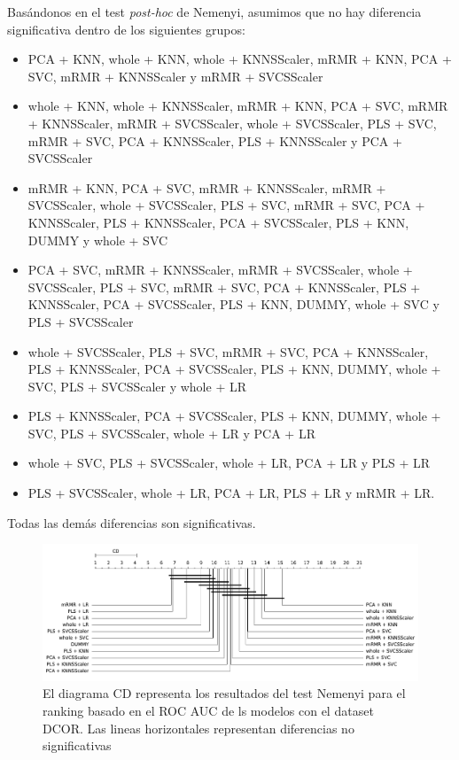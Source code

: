 \documentclass[a4paper,oneside,11pt,leqno]{article}
\begin{document}
	Basándonos en el test \textit{post-hoc} de Nemenyi, asumimos que no hay diferencia significativa dentro de los siguientes grupos:

	\begin{itemize}
		\item PCA + KNN, whole + KNN, whole + KNNSScaler, mRMR + KNN, PCA + SVC, mRMR + KNNSScaler y mRMR + SVCSScaler

		\item whole + KNN, whole + KNNSScaler, mRMR + KNN, PCA + SVC, mRMR + KNNSScaler, mRMR + SVCSScaler, whole + SVCSScaler, PLS + SVC, mRMR + SVC, PCA + KNNSScaler, PLS + KNNSScaler y PCA + SVCSScaler

		\item mRMR + KNN, PCA + SVC, mRMR + KNNSScaler, mRMR + SVCSScaler, whole + SVCSScaler, PLS + SVC, mRMR + SVC, PCA + KNNSScaler, PLS + KNNSScaler, PCA + SVCSScaler, PLS + KNN, DUMMY y whole + SVC

		\item PCA + SVC, mRMR + KNNSScaler, mRMR + SVCSScaler, whole + SVCSScaler, PLS + SVC, mRMR + SVC, PCA + KNNSScaler, PLS + KNNSScaler, PCA + SVCSScaler, PLS + KNN, DUMMY, whole + SVC y PLS + SVCSScaler

		\item  whole + SVCSScaler, PLS + SVC, mRMR + SVC, PCA + KNNSScaler, PLS + KNNSScaler, PCA + SVCSScaler, PLS + KNN, DUMMY, whole + SVC, PLS + SVCSScaler y whole + LR

		\item PLS + KNNSScaler, PCA + SVCSScaler, PLS + KNN, DUMMY, whole + SVC, PLS + SVCSScaler, whole + LR y PCA + LR

		\item whole + SVC, PLS + SVCSScaler, whole + LR, PCA + LR y PLS + LR

		\item PLS + SVCSScaler, whole + LR, PCA + LR, PLS + LR y mRMR + LR.
	\end{itemize}

	Todas las demás diferencias son significativas.

	\begin{figure}[h]
		\includegraphics[width=\linewidth]{stat_results_dcor.pdf}
		\caption{El diagrama CD representa los resultados del test Nemenyi para el ranking basado en el ROC AUC de ls modelos con el dataset DCOR. Las lineas horizontales representan diferencias no significativas}
		\label{fig:stats_fig_dcor}
	\end{figure}
\end{document}
